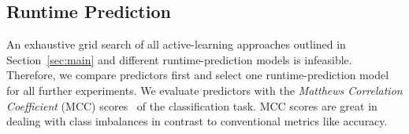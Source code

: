 \documentclass[runningheads]{llncs}
\begin{document}
\subsection{Runtime Prediction}
\label{sec:evalprel}

An exhaustive grid search of all active-learning approaches outlined in Section~\ref{sec:main} and different runtime-prediction models is infeasible.
Therefore, we compare predictors first and select one runtime-prediction model for all further experiments.
We evaluate predictors with the \emph{Matthews Correlation Coefficient} (MCC) scores~\cite{gorodkin2004comparing,matthews1975comparison} of the classification task.
MCC scores are great in dealing with class imbalances in contrast to conventional metrics like accuracy.

\end{document}
